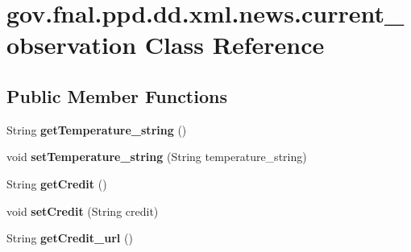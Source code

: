 \hypertarget{classgov_1_1fnal_1_1ppd_1_1dd_1_1xml_1_1news_1_1current__observation}{\section{gov.\-fnal.\-ppd.\-dd.\-xml.\-news.\-current\-\_\-observation Class Reference}
\label{classgov_1_1fnal_1_1ppd_1_1dd_1_1xml_1_1news_1_1current__observation}
}
\subsection*{Public Member Functions}
\begin{DoxyCompactItemize}
\item 
\hypertarget{classgov_1_1fnal_1_1ppd_1_1dd_1_1xml_1_1news_1_1current__observation_a1c019a92d90c5d1863de23290e46555c}{String {\bfseries get\-Temperature\-\_\-string} ()}\label{classgov_1_1fnal_1_1ppd_1_1dd_1_1xml_1_1news_1_1current__observation_a1c019a92d90c5d1863de23290e46555c}

\item 
\hypertarget{classgov_1_1fnal_1_1ppd_1_1dd_1_1xml_1_1news_1_1current__observation_a2e9a1a5d33d49074decc164be4489d59}{void {\bfseries set\-Temperature\-\_\-string} (String temperature\-\_\-string)}\label{classgov_1_1fnal_1_1ppd_1_1dd_1_1xml_1_1news_1_1current__observation_a2e9a1a5d33d49074decc164be4489d59}

\item 
\hypertarget{classgov_1_1fnal_1_1ppd_1_1dd_1_1xml_1_1news_1_1current__observation_af12af655b1d0180a010b18f76a5e8205}{String {\bfseries get\-Credit} ()}\label{classgov_1_1fnal_1_1ppd_1_1dd_1_1xml_1_1news_1_1current__observation_af12af655b1d0180a010b18f76a5e8205}

\item 
\hypertarget{classgov_1_1fnal_1_1ppd_1_1dd_1_1xml_1_1news_1_1current__observation_a8e2e20aa14ec19e9fc69decf8e6a0961}{void {\bfseries set\-Credit} (String credit)}\label{classgov_1_1fnal_1_1ppd_1_1dd_1_1xml_1_1news_1_1current__observation_a8e2e20aa14ec19e9fc69decf8e6a0961}

\item 
\hypertarget{classgov_1_1fnal_1_1ppd_1_1dd_1_1xml_1_1news_1_1current__observation_aeae0ae8bc486982546364ea64da1f63a}{String {\bfseries get\-Credit\-\_\-url} ()}\label{classgov_1_1fnal_1_1ppd_1_1dd_1_1xml_1_1news_1_1current__observation_aeae0ae8bc486982546364ea64da1f63a}


\end{DoxyCompactItemize}
